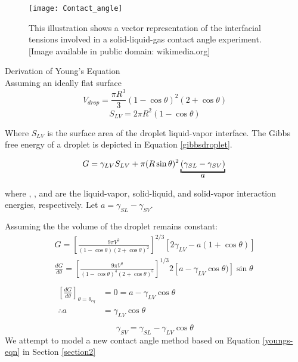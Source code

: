 \begin{figure}
	\centering
	\texttt{[image: Contact\_angle]}
	\caption{This illustration shows a vector representation of the interfacial tensions involved in a solid-liquid-gas contact angle experiment. [Image available in public domain: wikimedia.org]}
	\label{fig:ca-vector}
\end{figure}

Derivation of Young's Equation\\
Assuming an ideally flat surface
\begin{equation} \label{dropvol}
V_{drop} = \frac{\pi R^{3}}{3} (1-\cos\theta)^{2} (2+\cos\theta)
\end{equation}
\begin{equation} \label{liqvapSA}
S_{LV} = 2\pi R^{2} (1-\cos\theta)
\end{equation}

Where $S_{LV}$ is the surface area of the droplet liquid-vapor interface. The Gibbs free energy of a droplet is depicted in Equation \ref{gibbsdroplet}.

\begin{equation} \label{gibbsdroplet}
G = \gamma_{LV} S_{LV} + \pi(R \sin\theta)^{2} \underbracket{(\gamma_{SL}-\gamma_{SV})}_{\text{\normalsize{$a$}}}\\
\end{equation}

where \gamLV, \gamSL, and \gamSV are the liquid-vapor, solid-liquid, and solid-vapor interaction energies, respectively. Let $a = \gamma_{SL}-\gamma_{SV}$. 

Assuming the the volume of the droplet remains constant:
\begin{equation*}
\begin{gathered}
G = \left[\frac{9\pi V^{2}}{(1-\cos\theta)(2+\cos\theta)^{2}}\right]^{2/3}
\left[2\gamma_{LV} - a(1+\cos\theta)\right]\\
\frac{dG}{d\theta} = \left[\frac{9\pi V^{2}}{(1-\cos\theta)^{4}(2+\cos\theta)^{5}}\right]^{1/3}
2\left[a-\gamma_{LV}\cos\theta)\right]\sin\theta\\ \\
\begin{split}
\left[\frac{dG}{d\theta}\right]_{\theta=\theta_{eq}}&=0=a-\gamma_{LV}\cos\theta\\
\therefore a 	&= \gamma_{LV}\cos\theta\\
\end{split}					
\end{gathered}
\end{equation*}
\begin{equation}\label{youngs-eqn}
\boxed{\gamma_{SV} =\gamma_{SL}-\gamma_{LV}\cos\theta}	
\end{equation}
We attempt to model a new contact angle method based on Equation \ref{youngs-eqn} in Section \ref{section2}

